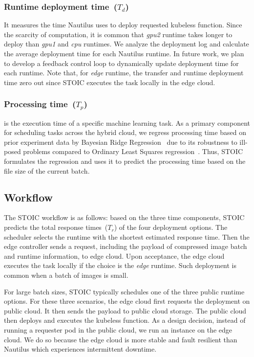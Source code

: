  \subsubsection{Runtime deployment time~($T_d$)} It measures the time Nautilus uses to deploy requested kubeless function. Since the scarcity of computation, it is common that \textit{gpu2} runtime takes longer to deploy than \textit{gpu1} and \textit{cpu} runtimes. We analyze the deployment log and calculate the average deployment time for each Nautilus runtime. In future work, we plan to develop a feedback control loop to dynamically update deployment time for each runtime. Note that, for \textit{edge} runtime, the transfer and runtime deployment time zero out since STOIC executes the task locally in the edge cloud.
 
 \subsubsection{Processing time~($T_p$)} is the execution time of a specific machine learning task. As a primary component for scheduling tasks across the hybrid cloud, we regress processing time based on prior experiment data by Bayesian Ridge Regression~\cite{ref:brr} due to its robustness to ill-posed problems compared to Ordinary Least Squares regression~\cite{ref:ols}. Thus, STOIC formulates the regression and uses it to predict the processing time based on the file size of the current batch. %
 
 \subsection{Workflow}
 The STOIC workflow is as follows: based on the three time components, STOIC predicts the total response times~($T_r$) of the four deployment options. The scheduler selects the runtime with the shortest estimated response time. Then the edge controller sends a request, including the payload of compressed image batch and runtime information, to edge cloud. Upon acceptance, the edge cloud executes the task locally if the choice is the \textit{edge} runtime. Such deployment is common when a batch of images is small. 

For large batch sizes, STOIC typically schedules one of the three public runtime options. For these three scenarios, the edge cloud first requests the deployment on public cloud. It then sends the payload to public cloud storage. The public cloud then deploys and executes the kubeless function. As a design decision, instead of running a requester pod in the public cloud, we run an instance on the edge cloud. We do so because the edge cloud is more stable and fault resilient than Nautilus which experiences intermittent downtime.  
 
